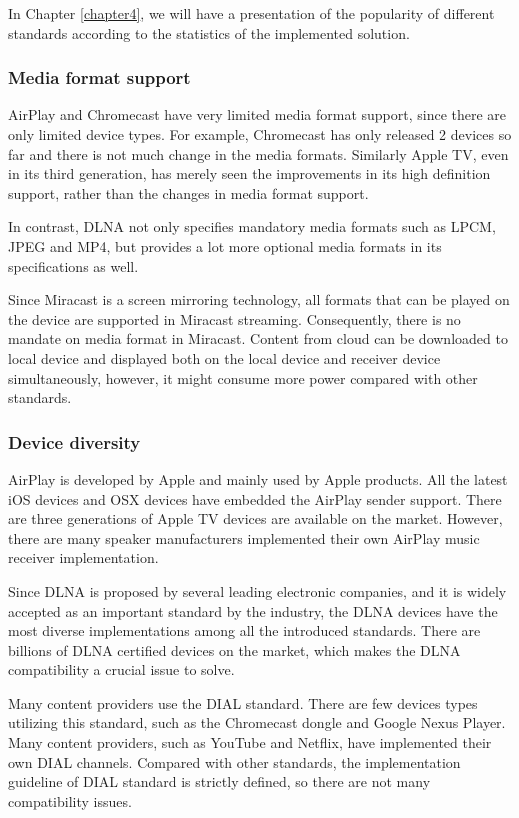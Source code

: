 In Chapter \ref{chapter4}, we will have a presentation of the popularity of
different standards according to the statistics of the implemented solution.
\subsubsection{Media format support\label{2_3_3_1}} 
AirPlay and Chromecast have very limited media format support, since there are 
only limited device types. For example, Chromecast has only released 2 devices
so far and there is not much change in the media formats. Similarly Apple TV,
even in its third generation,  has merely seen the improvements in its high
definition support, rather than the changes in media format support.

In contrast, DLNA not only specifies mandatory media formats such as LPCM, JPEG
and MP4, but provides a lot more optional media formats in its specifications
as well.

Since Miracast is a screen mirroring technology, all formats that can be played
on the device are supported in Miracast streaming. Consequently, there is no
mandate on media format in Miracast. Content from
cloud can be downloaded to local device and displayed both on the local device
and receiver device simultaneously, however, it might consume more power
compared with other standards. 
\subsubsection{Device diversity\label{2_3_3_3}}
AirPlay is developed by Apple and mainly used by Apple products. All the latest
iOS devices and OSX devices have embedded the AirPlay sender support. There are
three generations of Apple TV devices are available on the market. However,
there are many speaker manufacturers implemented their own AirPlay music
receiver implementation.

Since DLNA is proposed by several leading electronic companies, and it is
widely accepted as an important standard by the industry, the DLNA devices have
the most diverse implementations among all the introduced standards. There are
billions of DLNA certified devices on the market, which makes the DLNA
compatibility a crucial issue to solve.

Many content providers use the DIAL standard. There are few devices types
utilizing this standard, such as the Chromecast dongle and Google Nexus Player.
Many content providers, such as YouTube and Netflix, have implemented their own
DIAL channels. Compared with other standards, the implementation guideline of
DIAL standard is strictly defined, so there are not many compatibility issues.

